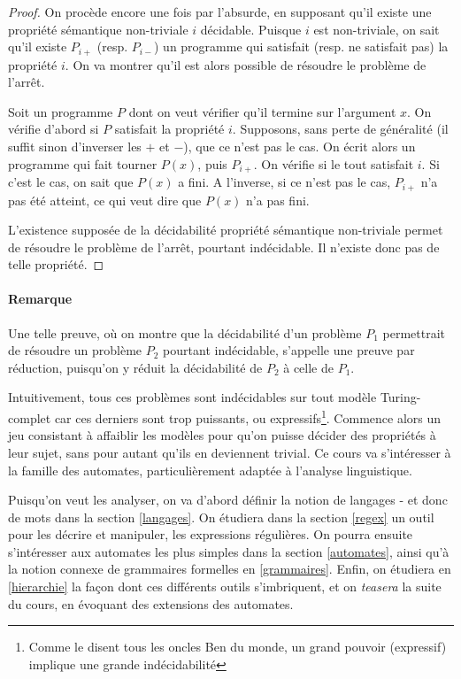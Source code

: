 \begin{proof}
On procède encore une fois par l'absurde, en supposant qu'il existe une propriété sémantique non-triviale $i$ décidable. Puisque $i$ est non-triviale, on sait qu'il existe $P_{i+}$ (resp. $P_{i-}$) un programme qui satisfait (resp. ne satisfait pas) la propriété $i$. On va montrer qu'il est alors possible de résoudre le problème de l'arrêt.

Soit un programme $P$ dont on veut vérifier qu'il termine sur l'argument $x$. On vérifie d'abord si $P$ satisfait la propriété $i$. Supposons, sans perte de généralité (il suffit sinon d'inverser les $+$ et $-$), que ce n'est pas le cas. On écrit alors un programme qui fait tourner $P(x)$, puis $P_{i+}$. On vérifie si le tout satisfait $i$. Si c'est le cas, on sait que $P(x)$ a fini. A l'inverse, si ce n'est pas le cas, $P_{i+}$ n'a pas été atteint, ce qui veut dire que $P(x)$ n'a pas fini.

L'existence supposée de la décidabilité propriété sémantique non-triviale permet de 
résoudre le problème de l'arrêt, pourtant indécidable. Il n'existe donc pas de telle propriété.\end{proof}

\paragraph{Remarque} Une telle preuve, où on montre que la décidabilité d'un problème $P_1$ permettrait de résoudre un problème $P_2$ pourtant indécidable, s'appelle une preuve par réduction, puisqu'on y réduit la décidabilité de $P_2$ à celle de $P_1$.

Intuitivement, tous ces problèmes sont indécidables sur tout modèle Turing-complet car ces derniers sont trop puissants, ou expressifs\footnote{Comme le disent tous les oncles Ben du monde, un grand pouvoir (expressif) implique une grande indécidabilité}. Commence alors un jeu consistant à affaiblir les modèles pour qu'on puisse décider des propriétés à leur sujet, sans pour autant qu'ils en deviennent trivial. Ce cours va s'intéresser à la famille des automates, particulièrement adaptée à l'analyse linguistique.%

Puisqu'on veut les analyser, on va d'abord définir la notion de langages - et donc de mots dans la section \ref{langages}. On étudiera dans la section \ref{regex} un outil pour les décrire et manipuler, les expressions régulières. On pourra ensuite s'intéresser aux automates les plus simples dans la section \ref{automates}, ainsi qu'à la notion connexe de grammaires formelles en \ref{grammaires}. Enfin, on étudiera en \ref{hierarchie} la façon dont ces différents outils s'imbriquent, et on \textit{teasera} la suite du cours, en évoquant des extensions des automates.
